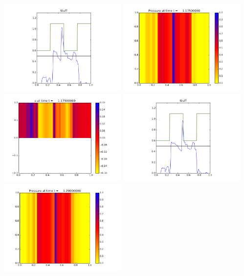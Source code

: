 \documentclass[11pt]{article}
\begin{document}
\vskip 10pt 
\includegraphics[width=0.475\textwidth]{frame0046fig3.png}
\vskip 10pt 
\includegraphics[width=0.475\textwidth]{frame0047fig0.png}
\includegraphics[width=0.475\textwidth]{frame0047fig1.png}
\vskip 10pt 
\includegraphics[width=0.475\textwidth]{frame0047fig3.png}
\vskip 10pt 
\includegraphics[width=0.475\textwidth]{frame0048fig0.png}
\end{document}

